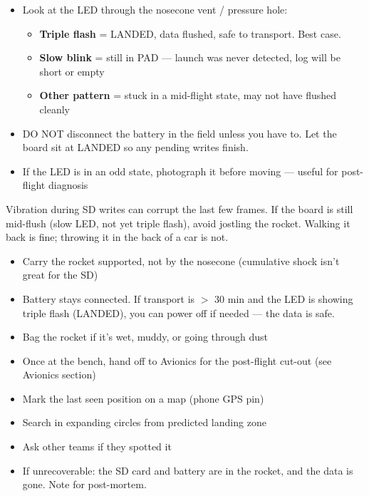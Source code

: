 \documentclass[11pt,a4paper,oneside]{report}
\begin{document}
\begin{itemize}
  \item Look at the LED through the nosecone vent / pressure hole:
  \begin{itemize}
    \item \textbf{Triple flash} = LANDED, data flushed, safe to transport. Best case.
    \item \textbf{Slow blink} = still in PAD --- launch was never detected, log will be short or empty
    \item \textbf{Other pattern} = stuck in a mid-flight state, may not have flushed cleanly
  \end{itemize}
  \item DO NOT disconnect the battery in the field unless you have to. Let the board sit at LANDED so any pending writes finish.
  \item If the LED is in an odd state, photograph it before moving --- useful for post-flight diagnosis
\end{itemize}

\begin{warnbox}
Vibration during SD writes can corrupt the last few frames. If the board is still mid-flush (slow LED, not yet triple flash), avoid jostling the rocket. Walking it back is fine; throwing it in the back of a car is not.
\end{warnbox}

\begin{itemize}
  \item Carry the rocket supported, not by the nosecone (cumulative shock isn't great for the SD)
  \item Battery stays connected. If transport is $>$ 30 min and the LED is showing triple flash (LANDED), you can power off if needed --- the data is safe.
  \item Bag the rocket if it's wet, muddy, or going through dust
  \item Once at the bench, hand off to Avionics for the post-flight cut-out (see Avionics section)
\end{itemize}

\begin{itemize}
  \item Mark the last seen position on a map (phone GPS pin)
  \item Search in expanding circles from predicted landing zone
  \item Ask other teams if they spotted it
  \item If unrecoverable: the SD card and battery are in the rocket, and the data is gone. Note for post-mortem.
\end{itemize}
\end{document}
